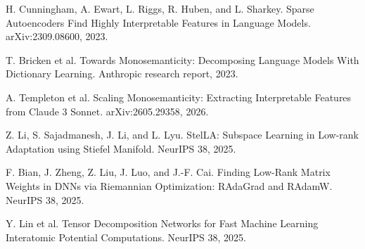 \documentclass[10pt]{article}
\begin{document}
\begin{description}[leftmargin=1.55cm,style=nextline,itemsep=.55em]
\item[\textbf{[CUN23]}] H. Cunningham, A. Ewart, L. Riggs, R. Huben, and L. Sharkey. Sparse Autoencoders Find Highly Interpretable Features in Language Models. arXiv:2309.08600, 2023.
\item[\textbf{[BRI23]}] T. Bricken et al. Towards Monosemanticity: Decomposing Language Models With Dictionary Learning. Anthropic research report, 2023.
\item[\textbf{[TEM26]}] A. Templeton et al. Scaling Monosemanticity: Extracting Interpretable Features from Claude 3 Sonnet. arXiv:2605.29358, 2026.
\item[\textbf{[LIS25]}] Z. Li, S. Sajadmanesh, J. Li, and L. Lyu. StelLA: Subspace Learning in Low-rank Adaptation using Stiefel Manifold. NeurIPS 38, 2025.
\item[\textbf{[BIA25]}] F. Bian, J. Zheng, Z. Liu, J. Luo, and J.-F. Cai. Finding Low-Rank Matrix Weights in DNNs via Riemannian Optimization: RAdaGrad and RAdamW. NeurIPS 38, 2025.
\item[\textbf{[LIN25]}] Y. Lin et al. Tensor Decomposition Networks for Fast Machine Learning Interatomic Potential Computations. NeurIPS 38, 2025.
\end{description}
\end{document}
